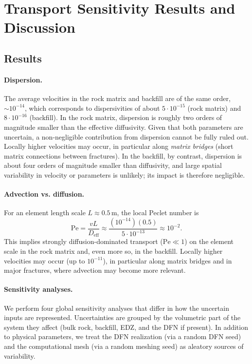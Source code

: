\section{Transport Sensitivity Results and Discussion}
\label{sec:transport_results}

\subsection{Results}

\paragraph{Dispersion.}
The average velocities in the rock matrix and backfill are of the same order,
$\sim 10^{-14}$, which corresponds to dispersivities of about
$5\cdot 10^{-15}$ (rock matrix) and $8\cdot 10^{-16}$ (backfill). In the rock
matrix, dispersion is roughly two orders of magnitude smaller than the
effective diffusivity.
Given that both parameters are uncertain, a non-negligible contribution from
dispersion cannot be fully ruled out. Locally higher velocities may occur, in
particular along \emph{matrix bridges} (short matrix connections between
fractures).
In the backfill, by contrast, dispersion is about four orders of magnitude
smaller than diffusivity, and large spatial variability in velocity or
parameters is unlikely; its impact is therefore negligible.

\paragraph{Advection vs. diffusion.}
For an element length scale $L \approx 0.5\,\mathrm{m}$, the local Peclet
number is
\[
\mathrm{Pe}=\frac{vL}{D_{\mathrm{eff}}}\approx \frac{(10^{-14})(0.5)}{5\cdot 10^{-13}} \approx 10^{-2}.
\]
This implies strongly diffusion-dominated transport ($\mathrm{Pe}\ll 1$) on the
element scale in the rock matrix and, even more so, in the backfill. Locally
higher velocities may occur (up to $10^{-11}$), in particular along matrix
bridges and in major fractures, where advection may become more relevant.

\paragraph{Sensitivity analyses.}
We perform four global sensitivity analyses that differ in how the uncertain
inputs are represented. Uncertainties are grouped by the volumetric part of the system
they affect (bulk rock, backfill, EDZ, and the DFN if present). In addition
to physical parameters, we treat the DFN realization (via a random DFN seed)
and the computational mesh (via a random meshing seed) as aleatory sources of
variability.


